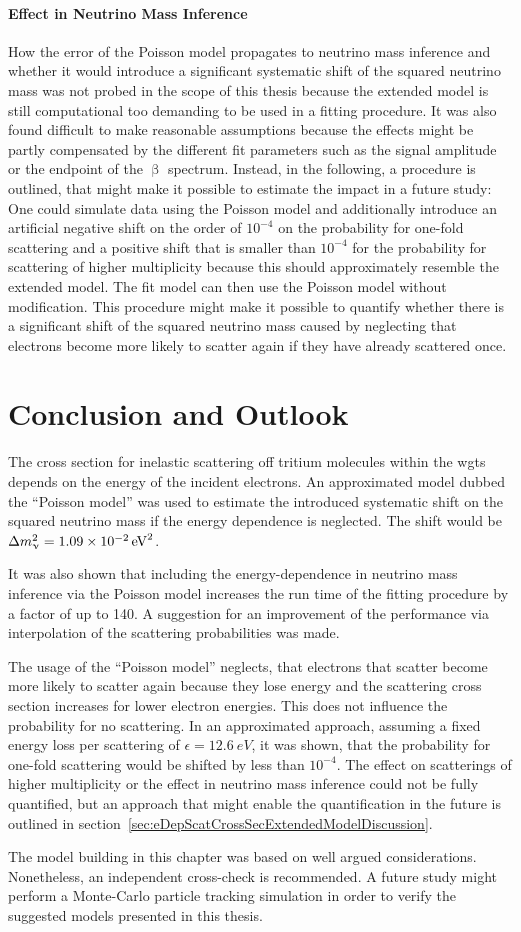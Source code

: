 \paragraph{Effect in Neutrino Mass Inference}
How the error of the Poisson model propagates to neutrino mass inference and whether it would introduce a significant systematic shift of the squared neutrino mass was not probed in the scope of this thesis because the extended model is still computational too demanding to be used in a fitting procedure. It was also found difficult to make reasonable assumptions because the effects might be partly compensated by the different fit parameters such as the signal amplitude or the endpoint of the $\upbeta$ spectrum. Instead, in the following, a procedure is outlined, that might make it possible to estimate the impact in a future study: One could simulate data using the Poisson model and additionally introduce an artificial negative shift on the order of $10^{-4}$ on the probability for one-fold scattering and a positive shift that is smaller than $10^{-4}$ for the probability for scattering of higher multiplicity because this should approximately resemble the extended model. The fit model can then use the Poisson model without modification. This procedure might make it possible to quantify whether there is a significant shift of the squared neutrino mass caused by neglecting that electrons become more likely to scatter again if they have already scattered once.

\section{Conclusion and Outlook}
\label{sec:eDepScatCrossSecConclusion}
The cross section for inelastic scattering off tritium molecules within the \gls{wgts} depends on the energy of the incident electrons. An approximated model dubbed the ``Poisson model'' was used to estimate the introduced systematic shift on the squared neutrino mass if the energy dependence is neglected. The shift would be $\Delta m_\upnu^2 = \SI{1.09e-2}{eV^2}$.

It was also shown that including the energy-dependence in neutrino mass inference via the Poisson model increases the run time of the fitting procedure by a factor of up to 140. A suggestion for an improvement of the performance via interpolation of the scattering probabilities was made.

The usage of the ``Poisson model'' neglects, that electrons that scatter become more likely to scatter again because they lose energy and the scattering cross section increases for lower electron energies. This does not influence the probability for no scattering. In an approximated approach, assuming a fixed energy loss per scattering of $\epsilon=\SI{12.6}{eV}$, it was shown, that the probability for one-fold scattering would be shifted by less than $10^{-4}$. The effect on scatterings of higher multiplicity or the effect in neutrino mass inference could not be fully quantified, but an approach that might enable the quantification in the future is outlined in section~\ref{sec:eDepScatCrossSecExtendedModelDiscussion}.

The model building in this chapter was based on well argued considerations. Nonetheless, an independent cross-check is recommended. A future study might perform a Monte-Carlo particle tracking simulation in order to verify the suggested models presented in this thesis.
